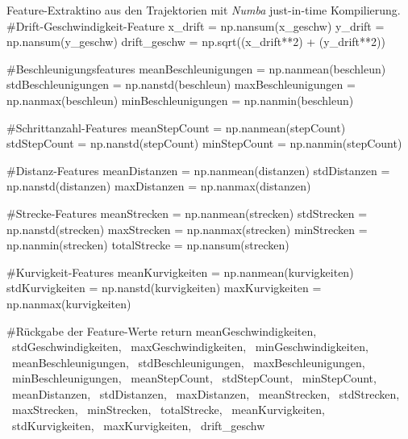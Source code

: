 \begin{pythoncodeAnhang}{Feature-Extraktino aus den Trajektorien mit \textit{Numba} just-in-time Kompilierung.}
    #Drift-Geschwindigkeit-Feature
    x_drift = np.nansum(x_geschw)
    y_drift = np.nansum(y_geschw)
    drift_geschw = np.sqrt((x_drift**2) + (y_drift**2))

    #Beschleunigungsfeatures
    meanBeschleunigungen = np.nanmean(beschleun)
    stdBeschleunigungen = np.nanstd(beschleun)
    maxBeschleunigungen = np.nanmax(beschleun)
    minBeschleunigungen = np.nanmin(beschleun)

    #Schrittanzahl-Features
    meanStepCount = np.nanmean(stepCount)
    stdStepCount = np.nanstd(stepCount)
    minStepCount = np.nanmin(stepCount)

    #Distanz-Features
    meanDistanzen = np.nanmean(distanzen)
    stdDistanzen = np.nanstd(distanzen)
    maxDistanzen = np.nanmax(distanzen)

    #Strecke-Features
    meanStrecken = np.nanmean(strecken)
    stdStrecken = np.nanstd(strecken)
    maxStrecken = np.nanmax(strecken)
    minStrecken = np.nanmin(strecken)
    totalStrecke = np.nansum(strecken)

    #Kurvigkeit-Features
    meanKurvigkeiten = np.nanmean(kurvigkeiten)
    stdKurvigkeiten = np.nanstd(kurvigkeiten)
    maxKurvigkeiten = np.nanmax(kurvigkeiten)

    #Rückgabe der Feature-Werte
    return  meanGeschwindigkeiten, \
            stdGeschwindigkeiten, \
            maxGeschwindigkeiten, \
            minGeschwindigkeiten, \
            meanBeschleunigungen, \
            stdBeschleunigungen, \
            maxBeschleunigungen, \
            minBeschleunigungen, \
            meanStepCount, \
            stdStepCount, \
            minStepCount, \
            meanDistanzen, \
            stdDistanzen, \
            maxDistanzen, \
            meanStrecken, \
            stdStrecken, \
            maxStrecken, \
            minStrecken, \
            totalStrecke, \
            meanKurvigkeiten, \
            stdKurvigkeiten, \
            maxKurvigkeiten, \
            drift_geschw
\end{pythoncodeAnhang}
